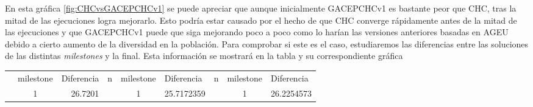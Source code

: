 En esta gráfica \ref{fig:CHCvsGACEPCHCv1} se puede apreciar que aunque inicialmente GACEPCHCv1 es bastante peor que CHC, tras la mitad de las ejecuciones logra mejorarlo. 
Esto podría estar causado por el hecho de que CHC converge rápidamente antes de la mitad de las ejecuciones y que GACEPCHCv1 puede que siga mejorando poco a poco como lo harían las versiones anteriores basadas en AGEU debido a cierto aumento de la diversidad en la población. 
Para comprobar si este es el caso, estudiaremos las diferencias entre las soluciones de las distintas \textit{milestones} y la final. 
Esta información se mostrará en la tabla y su correspondiente gráfica

\begin{table}[]
\begin{tabular}{|ccrccrccr|}
\hline
\rowcolor[HTML]{FFFFC7} 
\multicolumn{9}{|c|}{\cellcolor[HTML]{FFFFC7}GACEPCHCv1}                                                                                                                                                                                                                                                                                                                                                                                                                                                                                                                                             \\ \hline
\rowcolor[HTML]{F7EAC7} 
\multicolumn{1}{|c|}{\cellcolor[HTML]{F7EAC7}n}                               & \multicolumn{1}{c|}{\cellcolor[HTML]{F7EAC7}milestone} & \multicolumn{1}{l|}{\cellcolor[HTML]{F7EAC7}Diferencia} & \multicolumn{1}{c|}{\cellcolor[HTML]{F7EAC7}n}                               & \multicolumn{1}{c|}{\cellcolor[HTML]{F7EAC7}milestone} & \multicolumn{1}{l|}{\cellcolor[HTML]{F7EAC7}Diferencia} & \multicolumn{1}{c|}{\cellcolor[HTML]{F7EAC7}n}                               & \multicolumn{1}{c|}{\cellcolor[HTML]{F7EAC7}milestone} & \multicolumn{1}{l|}{\cellcolor[HTML]{F7EAC7}Diferencia} \\ \hline
\rowcolor[HTML]{DAE8FC} 
\multicolumn{1}{|c|}{\cellcolor[HTML]{FFFFC7}}                                & \multicolumn{1}{c|}{\cellcolor[HTML]{DAE8FC}1}         & \multicolumn{1}{r|}{\cellcolor[HTML]{DAE8FC}26.7201}    & \multicolumn{1}{c|}{\cellcolor[HTML]{FFFFC7}}                                & \multicolumn{1}{c|}{\cellcolor[HTML]{DAE8FC}1}         & \multicolumn{1}{r|}{\cellcolor[HTML]{DAE8FC}25.7172359} & \multicolumn{1}{c|}{\cellcolor[HTML]{FFFFC7}}                                & \multicolumn{1}{c|}{\cellcolor[HTML]{DAE8FC}1}         & 26.2254573                                              \\ \cline{2-3} \cline{5-6} \cline{8-9} 

\end{tabular}
\end{table}
